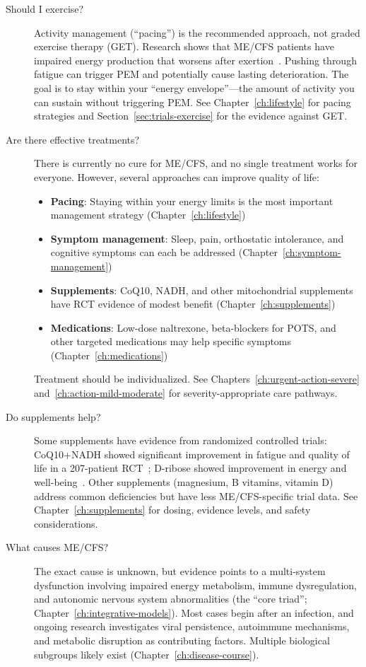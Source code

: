 \begin{description}
\item[Should I exercise?]
Activity management (``pacing'') is the recommended approach, not graded
exercise therapy (GET). Research shows that ME/CFS patients have impaired
energy production that worsens after exertion~\cite{keller2024cpet}. Pushing
through fatigue can trigger PEM and potentially cause lasting deterioration.
The goal is to stay within your ``energy envelope''---the amount of activity
you can sustain without triggering PEM. See Chapter~\ref{ch:lifestyle} for
pacing strategies and Section~\ref{sec:trials-exercise} for the evidence
against GET.

\item[Are there effective treatments?]
There is currently no cure for ME/CFS, and no single treatment works for
everyone. However, several approaches can improve quality of life:
\begin{itemize}
    \item \textbf{Pacing}: Staying within your energy limits is the most
      important management strategy (Chapter~\ref{ch:lifestyle})
    \item \textbf{Symptom management}: Sleep, pain, orthostatic intolerance,
      and cognitive symptoms can each be addressed
      (Chapter~\ref{ch:symptom-management})
    \item \textbf{Supplements}: CoQ10, NADH, and other mitochondrial
      supplements have RCT evidence of modest benefit
      (Chapter~\ref{ch:supplements})
    \item \textbf{Medications}: Low-dose naltrexone, beta-blockers for POTS,
      and other targeted medications may help specific symptoms
      (Chapter~\ref{ch:medications})
\end{itemize}
Treatment should be individualized. See Chapters~\ref{ch:urgent-action-severe}
and~\ref{ch:action-mild-moderate} for severity-appropriate care pathways.

\item[Do supplements help?]
Some supplements have evidence from randomized controlled trials:
CoQ10+NADH showed significant improvement in fatigue and quality of life in a
207-patient RCT~\cite{CastroMarrero2021fatigue}; D-ribose showed improvement in
energy and well-being~\cite{Teitelbaum2006ribose}. Other supplements
(magnesium, B vitamins, vitamin D) address common deficiencies but have less
ME/CFS-specific trial data. See Chapter~\ref{ch:supplements} for dosing,
evidence levels, and safety considerations.

\item[What causes ME/CFS?]
The exact cause is unknown, but evidence points to a multi-system dysfunction
involving impaired energy metabolism, immune dysregulation, and autonomic
nervous system abnormalities (the ``core triad'';
Chapter~\ref{ch:integrative-models}). Most cases begin after an infection,
and ongoing research investigates viral persistence, autoimmune mechanisms,
and metabolic disruption as contributing factors. Multiple biological
subgroups likely exist (Chapter~\ref{ch:disease-course}).


\end{description}
